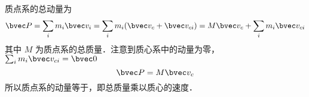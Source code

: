 
质点系的总动量为
\begin{equation}
\bvec P = \sum_i m_i \bvec v_i  = \sum_i m_i (\bvec v_c + \bvec v_{ci})  = M \bvec v_c + \sum_i  m_i \bvec v_{ci} 
\end{equation}
其中 $M$ 为质点系的总质量．注意到质心系中的动量为零， $\sum_i  m_i \bvec v_{ci}  = \bvec 0$
\begin{equation}\label{SysP_eq2}
\bvec P = M \bvec v_c
\end{equation}
所以质点系的动量等于，即总质量乘以质心的速度．
